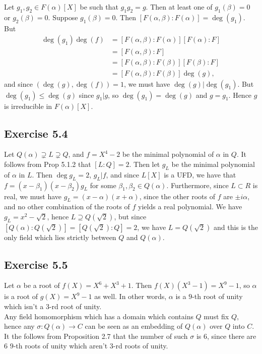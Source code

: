 \documentclass{article}
\theoremstyle{definition}
\begin{document}
Let $g_1, g_2 \in F(\alpha)[X]$ be such that $g_1g_2 = g$. Then at least one of
$g_1(\beta) = 0$ or $g_2(\beta) = 0$. Suppose $g_1(\beta) = 0$. Then
$[F(\alpha, \beta): F(\alpha)] = \deg(g_1)$. But
\begin{align*}
	\deg(g_1)\deg(f)
	&=
	[F(\alpha, \beta): F(\alpha)][F(\alpha): F] \\
	&=
	[F(\alpha, \beta): F] \\
	&=
	[F(\alpha, \beta): F(\beta)][F(\beta): F] \\
	&=
	[F(\alpha, \beta): F(\beta)]\deg(g),
\end{align*}
and since $(\deg(g), \deg(f)) = 1$, we must have $\deg(g) | \deg(g_1)$. But
$\deg(g_1) \leq \deg(g)$ since $g_1 | g$, so $\deg(g_1) = \deg(g)$ and $g =
g_1$. Hence $g$ is irreducible in $F(\alpha)[X]$.

\subsection*{Exercise 5.4} 

Let $Q(\alpha) \supsetneq L \supsetneq Q$, and $f = X^{4} - 2$ be the minimal
polynomial of $\alpha$ in $Q$. It follows from Prop 5.1.2 that $[L:Q] =  2$.
Then let $g_L$ be the minimal polynomial of $\alpha$ in $L$. Then $\deg g_L =
2$, $g_L | f$, and since $L[X]$ is a UFD, we have that $f = (x - \beta_1)(x -
\beta_2)g_L$ for some $\beta_1, \beta_2 \in Q(\alpha)$. Furthermore, since $L
\subset R$ is real, we must have $g_L = (x - \alpha)(x + \alpha)$, since the
other roots of $f$ are $\pm i \alpha$, and no other combination of the roots of
$f$ yields a real polynomial. We have $g_L = x^{2} - \sqrt{2}$, hence $L
\supseteq Q(\sqrt{2})$, but since $[Q(\alpha):Q(\sqrt{2})] = [Q(\sqrt{2}): Q] =
2$, we have $L = Q(\sqrt{2})$ and this is the only field which lies strictly
between $Q$ and $Q(\alpha)$.

\subsection*{Exercise 5.5} 

Let $\alpha$ be a root of $f(X) = X^{6} + X^{3} + 1$. Then $f(X)(X^{3} - 1) =
X^{9} - 1$, so $\alpha$ is a root of $g(X) = X^{9} - 1$ as well. In other
words, $\alpha$ is a $9$-th root of unity which isn't a $3$-rd root of unity. \\

Any field homomorphism which has a domain which contains $Q$ must fix $Q$,
hence any $\sigma: Q(\alpha) \to C$ can be seen as an embedding of $Q(\alpha)$
over $Q$ into $C$. It the follows from Proposition 2.7 that the number of such
$\sigma$ is $6$, since there are $6$ $9$-th roots of unity which aren't $3$-rd
roots of unity.
\end{document}
